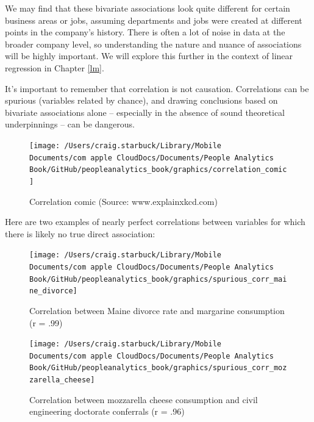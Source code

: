 \documentclass[
]{book}
\begin{document}
We may find that these bivariate associations look quite different for certain business areas or jobs, assuming departments and jobs were created at different points in the company's history. There is often a lot of noise in data at the broader company level, so understanding the nature and nuance of associations will be highly important. We will explore this further in the context of linear regression in Chapter \ref{lm}.

It's important to remember that correlation is not causation. Correlations can be spurious (variables related by chance), and drawing conclusions based on bivariate associations alone -- especially in the absence of sound theoretical underpinnings -- can be dangerous.

\begin{figure}

{\centering \texttt{[image: /Users/craig.starbuck/Library/Mobile Documents/com~apple~CloudDocs/Documents/People Analytics Book/GitHub/peopleanalytics\_book/graphics/correlation\_comic]} 

}

\caption{Correlation comic (Source: www.explainxkcd.com)}\label{fig:corr-comic}
\end{figure}

Here are two examples of nearly perfect correlations between variables for which there is likely no true direct association:

\begin{figure}

{\centering \texttt{[image: /Users/craig.starbuck/Library/Mobile Documents/com~apple~CloudDocs/Documents/People Analytics Book/GitHub/peopleanalytics\_book/graphics/spurious\_corr\_maine\_divorce]} 

}

\caption{Correlation between Maine divorce rate and margarine consumption (r = .99)}\label{fig:spur-corr-1}
\end{figure}

\begin{figure}

{\centering \texttt{[image: /Users/craig.starbuck/Library/Mobile Documents/com~apple~CloudDocs/Documents/People Analytics Book/GitHub/peopleanalytics\_book/graphics/spurious\_corr\_mozzarella\_cheese]} 

}

\caption{Correlation between mozzarella cheese consumption and civil engineering doctorate conferrals (r = .96)}\label{fig:spur-corr-2}
\end{figure}
\end{document}
